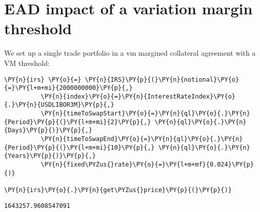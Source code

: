     

    
    \hypertarget{ead-impact-of-a-variation-margin-threshold}{%
\section{EAD impact of a variation margin
threshold}\label{ead-impact-of-a-variation-margin-threshold}}

We set up a single trade portfolio in a vm margined collateral agreement
with a VM threshold:

    \begin{tcolorbox}[breakable, size=fbox, boxrule=1pt, pad at break*=1mm,colback=cellbackground, colframe=cellborder]
\begin{Verbatim}[commandchars=\\\{\}]
\PY{n}{irs} \PY{o}{=} \PY{n}{IRS}\PY{p}{(}\PY{n}{notional}\PY{o}{=}\PY{l+m+mi}{2000000000}\PY{p}{,}
          \PY{n}{index}\PY{o}{=}\PY{n}{InterestRateIndex}\PY{o}{.}\PY{n}{USDLIBOR3M}\PY{p}{,}
          \PY{n}{timeToSwapStart}\PY{o}{=}\PY{n}{ql}\PY{o}{.}\PY{n}{Period}\PY{p}{(}\PY{l+m+mi}{2}\PY{p}{,} \PY{n}{ql}\PY{o}{.}\PY{n}{Days}\PY{p}{)}\PY{p}{,}
          \PY{n}{timeToSwapEnd}\PY{o}{=}\PY{n}{ql}\PY{o}{.}\PY{n}{Period}\PY{p}{(}\PY{l+m+mi}{10}\PY{p}{,} \PY{n}{ql}\PY{o}{.}\PY{n}{Years}\PY{p}{)}\PY{p}{,}
          \PY{n}{fixed\PYZus{}rate}\PY{o}{=}\PY{l+m+mf}{0.024}\PY{p}{)}

\PY{n}{irs}\PY{o}{.}\PY{n}{get\PYZus{}price}\PY{p}{(}\PY{p}{)}
\end{Verbatim}
\end{tcolorbox}

            \begin{tcolorbox}[breakable, size=fbox, boxrule=.5pt, pad at break*=1mm, opacityfill=0]
\begin{Verbatim}[commandchars=\\\{\}]
1643257.9608547091
\end{Verbatim}
\end{tcolorbox}
        
